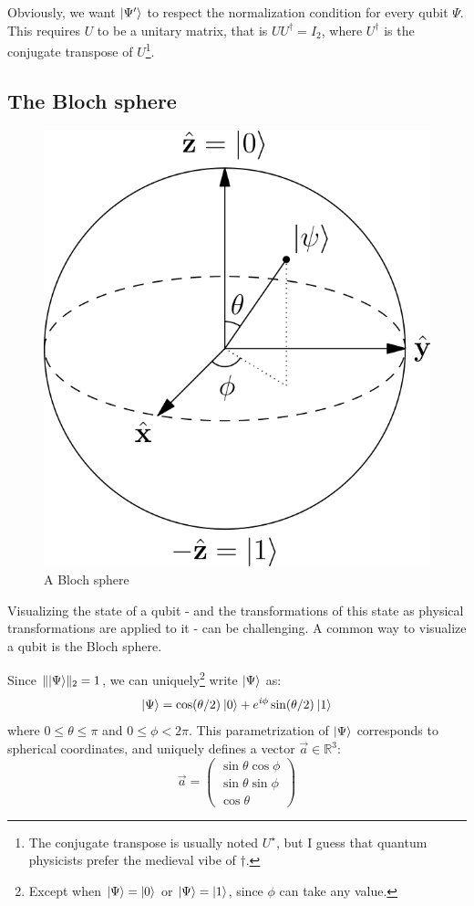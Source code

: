 \documentclass[12pt,a4paper]{article}
\theoremstyle{plain}
\theoremstyle{definition}
\DeclarePairedDelimiter\ket{\lvert}{\rangle}
\begin{document}
Obviously, we want $\ket{\Psi'}$ to respect the normalization condition for every qubit $\Psi$. This requires $U$ to be a unitary matrix, that is $UU^\dagger = I_2$, where $U^\dagger$ is the conjugate transpose of $U$\footnote{The conjugate transpose is usually noted $U^\star$, but I guess that quantum physicists prefer the medieval vibe of $\dagger$.}.

\subsection{The Bloch sphere}
\begin{figure}
    \centering
    \includegraphics*{bloch-sphere}
    \caption{A Bloch sphere}
\end{figure}

Visualizing the state of a qubit - and the transformations of this state as physical transformations are applied to it - can be challenging. A common way to visualize a qubit is the Bloch sphere.

Since $\|\ket{\Psi}\|_2=1$, we can uniquely\footnote{Except when $\ket{\Psi}=\ket{0}$ or $\ket{\Psi}=\ket{1}$, since $\phi$ can take any value.} write $\ket{\Psi}$ as:
\begin{equation*}
    \ket{\Psi}=\cos(\theta/2)\:\ket{0} + e^{i\phi}\sin(\theta/2)\: \ket{1}
\end{equation*}
where $0\leq\theta\leq\pi$ and $0\leq\phi<2\pi$. This parametrization of $\ket{\Psi}$ corresponds to spherical coordinates, and uniquely defines a vector $\vec{a}\in\mathbb{R}^3$:
\begin{equation*}
    \vec{a}=\begin{pmatrix}\sin\theta\cos\phi\\\sin\theta\sin\phi\\\cos\theta\end{pmatrix}
\end{equation*}
\end{document}
